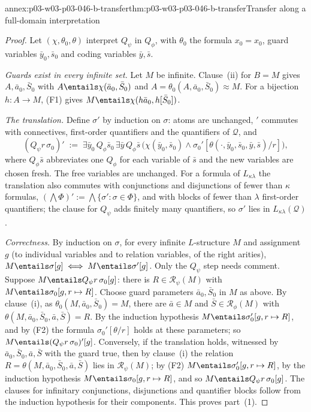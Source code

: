 \begin{annexitem}{annex:p03-w03-p03-046-b-transfer}{thm:p03-w03-p03-046-b-transfer}{Transfer along a full-domain interpretation}
\begin{proof}
Let \((\chi,\theta_0,\theta)\) interpret \(Q_\psi\) in \(Q_\phi\), with
\(\theta_0\) the formula \(x_0=x_0\), guard variables
\(\bar y_0,\bar s_0\) and coding variables \(\bar y,\bar s\).

\emph{Guards exist in every infinite set.} Let \(M\) be infinite. Clause~(ii)
for \(B=M\) gives \(A,\bar a_0,\bar S_0\) with
\(A\entails\chi(\bar a_0,\bar S_0)\) and \(A=\theta_0(A,\bar a_0,\bar
S_0)\approx M\). For a bijection \(h\colon A\to M\), (F1) gives
\(M\entails\chi(h\bar a_0,h[\bar S_0])\).

\emph{The translation.} Define \(\sigma'\) by induction on \(\sigma\):
atoms are unchanged, \('\) commutes with connectives, first-order
quantifiers and the quantifiers of \(\mathcal Q\), and
\[
(Q_\psi r\,\sigma_0)'\;:=\;\exists\bar y_0\,Q_\phi\bar s_0\,\exists\bar
y\,Q_\phi\bar s\,\bigl(\chi(\bar y_0,\bar s_0)\wedge
\sigma_0'[\theta(\cdot,\bar y_0,\bar s_0,\bar y,\bar s)/r]\bigr),
\]
where \(Q_\phi\bar s\) abbreviates one \(Q_\phi\) for each variable of
\(\bar s\) and the new variables are chosen fresh. The free variables are
unchanged. For a formula of \(L_{\kappa\lambda}\) the translation also
commutes with conjunctions and disjunctions of fewer than \(\kappa\)
formulas, \((\bigwedge\Phi)':=\bigwedge\{\sigma':\sigma\in\Phi\}\), and with
blocks of fewer than \(\lambda\) first-order quantifiers; the clause for
\(Q_\psi\) adds finitely many quantifiers, so \(\sigma'\) lies in
\(L_{\kappa\lambda}(\mathcal Q)\).

\emph{Correctness.} By induction on \(\sigma\), for every infinite
\(L\)-structure \(M\) and assignment \(g\) (to individual variables and
to relation variables, of the right arities),
\(M\entails\sigma[g]\iff M\entails\sigma'[g]\). Only the \(Q_\psi\) step
needs comment. Suppose \(M\entails Q_\psi r\,\sigma_0[g]\): there is
\(R\in\mathscr R_\psi(M)\) with \(M\entails\sigma_0[g,r\mapsto R]\). Choose
guard parameters \(\bar a_0,\bar S_0\) in \(M\) as above. By clause~(i),
as \(\theta_0(M,\bar a_0,\bar S_0)=M\), there are \(\bar a\in M\) and
\(\bar S\in\mathscr R_\phi(M)\) with \(\theta(M,\bar a_0,\bar S_0,\bar
a,\bar S)=R\). By the induction hypothesis
\(M\entails\sigma_0'[g,r\mapsto R]\), and by (F2) the formula
\(\sigma_0'[\theta/r]\) holds at these parameters; so
\(M\entails(Q_\psi r\,\sigma_0)'[g]\). Conversely, if the translation holds,
witnessed by \(\bar a_0,\bar S_0,\bar a,\bar S\) with the guard true, then
by clause~(i) the relation \(R=\theta(M,\bar a_0,\bar S_0,\bar a,\bar S)\)
lies in \(\mathscr R_\psi(M)\); by (F2) \(M\entails\sigma_0'[g,r\mapsto
R]\), by the induction hypothesis \(M\entails\sigma_0[g,r\mapsto R]\), and
so \(M\entails Q_\psi r\,\sigma_0[g]\). The clauses for infinitary
conjunctions, disjunctions and quantifier blocks follow from the induction
hypothesis for their components. This proves part~(1).


\end{proof}
\end{annexitem}

